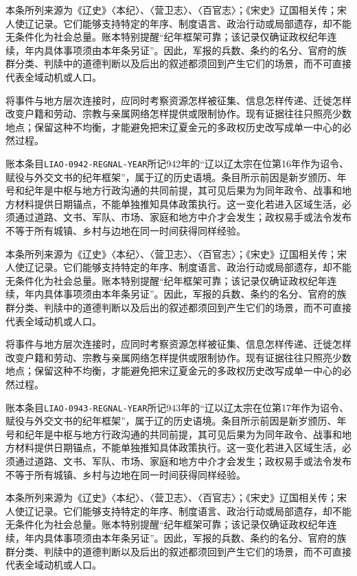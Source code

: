 本条所列来源为《辽史》〈本纪〉、〈营卫志〉、〈百官志〉；《宋史》辽国相关传；宋人使辽记录。它们能够支持特定的年序、制度语言、政治行动或局部遗存，却不能无条件化为社会总量。账本特别提醒“纪年框架可靠；该记录仅确证政权纪年连续，年内具体事项须由本年条另证”。因此，军报的兵数、条约的名分、官府的族群分类、判牍中的道德判断以及后出的叙述都须回到产生它们的场景，而不可直接代表全域动机或人口。

将事件与地方层次连接时，应同时考察资源怎样被征集、信息怎样传递、迁徙怎样改变户籍和劳动、宗教与亲属网络怎样提供或限制协作。现有证据往往只照亮少数地点；保留这种不均衡，才能避免把宋辽夏金元的多政权历史改写成单一中心的必然过程。

账本条目\texttt{LIAO-0942-REGNAL-YEAR}所记942年的“辽以辽太宗在位第16年作为诏令、赋役与外交文书的纪年框架”，属于辽的历史语境。条目所示前因是新岁颁历、年号和纪年是中枢与地方行政沟通的共同前提，其可见后果为为同年政令、战事和地方材料提供日期锚点，不能单独推知具体政策执行。这一变化若进入区域生活，必须通过道路、文书、军队、市场、家庭和地方中介才会发生；政权易手或法令发布不等于所有城镇、乡村与边地在同一时间获得同样经验。

本条所列来源为《辽史》〈本纪〉、〈营卫志〉、〈百官志〉；《宋史》辽国相关传；宋人使辽记录。它们能够支持特定的年序、制度语言、政治行动或局部遗存，却不能无条件化为社会总量。账本特别提醒“纪年框架可靠；该记录仅确证政权纪年连续，年内具体事项须由本年条另证”。因此，军报的兵数、条约的名分、官府的族群分类、判牍中的道德判断以及后出的叙述都须回到产生它们的场景，而不可直接代表全域动机或人口。

将事件与地方层次连接时，应同时考察资源怎样被征集、信息怎样传递、迁徙怎样改变户籍和劳动、宗教与亲属网络怎样提供或限制协作。现有证据往往只照亮少数地点；保留这种不均衡，才能避免把宋辽夏金元的多政权历史改写成单一中心的必然过程。

账本条目\texttt{LIAO-0943-REGNAL-YEAR}所记943年的“辽以辽太宗在位第17年作为诏令、赋役与外交文书的纪年框架”，属于辽的历史语境。条目所示前因是新岁颁历、年号和纪年是中枢与地方行政沟通的共同前提，其可见后果为为同年政令、战事和地方材料提供日期锚点，不能单独推知具体政策执行。这一变化若进入区域生活，必须通过道路、文书、军队、市场、家庭和地方中介才会发生；政权易手或法令发布不等于所有城镇、乡村与边地在同一时间获得同样经验。

本条所列来源为《辽史》〈本纪〉、〈营卫志〉、〈百官志〉；《宋史》辽国相关传；宋人使辽记录。它们能够支持特定的年序、制度语言、政治行动或局部遗存，却不能无条件化为社会总量。账本特别提醒“纪年框架可靠；该记录仅确证政权纪年连续，年内具体事项须由本年条另证”。因此，军报的兵数、条约的名分、官府的族群分类、判牍中的道德判断以及后出的叙述都须回到产生它们的场景，而不可直接代表全域动机或人口。

